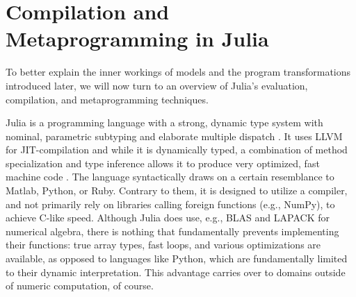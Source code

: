 \section{Compilation and Metaprogramming in Julia}
\label{sec:comp-metapr-julia}

To better explain the inner workings of \turingjl{} models and the program transformations
introduced later, we will now turn to an overview of Julia's evaluation, compilation, and
metaprogramming techniques.

Julia \parencite{bezanson2017julia} is a programming language with a strong, dynamic type system
with nominal, parametric subtyping \parencite{pierce2002types} and elaborate multiple dispatch
\parencite{bruce1995binary}.  It uses LLVM \parencite{llvmproject2019llvm} for JIT-compilation and
while it is dynamically typed, a combination of method specialization and type inference allows it
to produce very optimized, fast machine code \parencite{bezanson2018julia}.  The language
syntactically draws on a certain resemblance to Matlab, Python, or Ruby.  Contrary to them, it is
designed to utilize a compiler, and not primarily rely on libraries calling foreign functions (e.g.,
NumPy), to achieve C-like speed.  Although Julia does use, e.g., BLAS and LAPACK for numerical
algebra, there is nothing that fundamentally prevents implementing their functions: true array
types, fast loops, and various optimizations are available, as opposed to languages like Python,
which are fundamentally limited to their dynamic interpretation.  This advantage carries over to
domains outside of numeric computation, of course.

